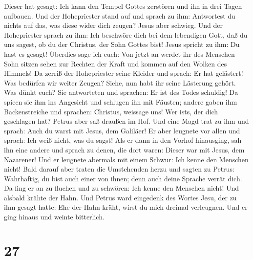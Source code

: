 Dieser hat gesagt: Ich kann den Tempel Gottes zerstören und ihn in drei
Tagen aufbauen.  Und der Hohepriester stand auf und
sprach zu ihm: Antwortest du nichts auf das, was diese wider dich
zeugen?  Jesus aber schwieg. Und der Hohepriester sprach
zu ihm: Ich beschwöre dich bei dem lebendigen Gott, daß du uns sagest,
ob du der Christus, der Sohn Gottes bist!  Jesus spricht
zu ihm: Du hast es gesagt! Überdies sage ich euch: Von jetzt an werdet
ihr des Menschen Sohn sitzen sehen zur Rechten der Kraft und kommen auf
den Wolken des Himmels!  Da zerriß der Hohepriester seine
Kleider und sprach: Er hat gelästert! Was bedürfen wir weiter Zeugen?
Siehe, nun habt ihr seine Lästerung gehört.  Was dünkt
euch? Sie antworteten und sprachen: Er ist des Todes schuldig!
 Da spieen sie ihm ins Angesicht und schlugen ihn mit
Fäusten; andere gaben ihm Backenstreiche  und sprachen:
Christus, weissage uns! Wer ist\textquotesingle s, der dich geschlagen
hat?  Petrus aber saß draußen im Hof. Und eine Magd trat
zu ihm und sprach: Auch du warst mit Jesus, dem Galiläer!
 Er aber leugnete vor allen und sprach: Ich weiß nicht,
was du sagst!  Als er dann in den Vorhof hinausging, sah
ihn eine andere und sprach zu denen, die dort waren: Dieser war mit
Jesus, dem Nazarener!  Und er leugnete abermals mit einem
Schwur: Ich kenne den Menschen nicht!  Bald darauf aber
traten die Umstehenden herzu und sagten zu Petrus: Wahrhaftig, du bist
auch einer von ihnen; denn auch deine Sprache verrät dich.
 Da fing er an zu fluchen und zu schwören: Ich kenne den
Menschen nicht! Und alsbald krähte der Hahn.  Und Petrus
ward eingedenk des Wortes Jesu, der zu ihm gesagt hatte: Ehe der Hahn
kräht, wirst du mich dreimal verleugnen. Und er ging hinaus und weinte
bitterlich.

\hypertarget{section-26}{%
\section{27}\label{section-26}}

